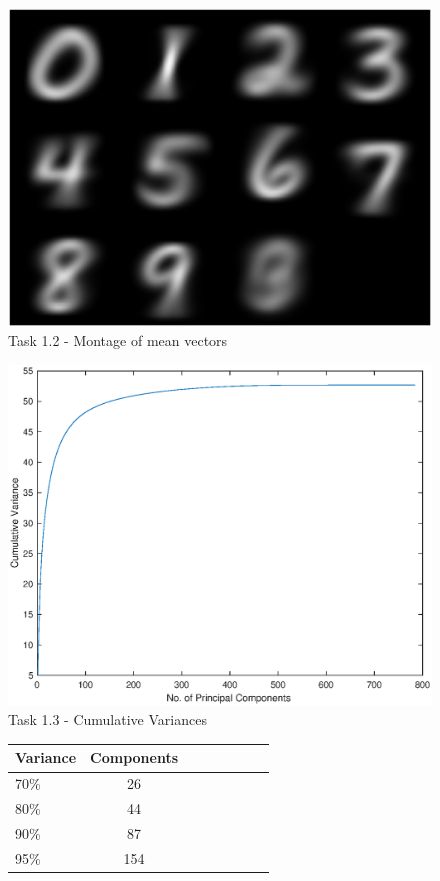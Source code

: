 \documentclass{article}
\begin{document}
\begin{figure}
 \centering
	\includegraphics[width=150mm]{task1_2_imgs.eps}
 \caption{Task 1.2 - Montage of mean vectors}
\end{figure}
\begin{figure}
 \centering
	\includegraphics[width=150mm]{task1_3_graph.eps}
 \caption{Task 1.3 - Cumulative Variances}
\end{figure}
\begin{figure}
\centering
\begin{tabular}{l*{6}{c}r}
Variance      &      Components \\
\hline
70\% & 26   \\
80\%            & 44   \\
90\%           & 87   \\
95\%           & 154 \\
\end{tabular}
\end{figure}
\end{document}

